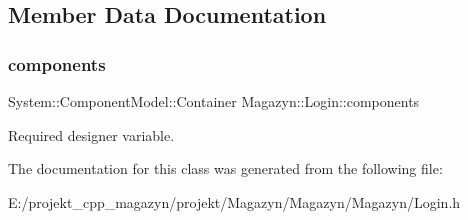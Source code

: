 \subsection{Member Data Documentation}
\hypertarget{class_magazyn_1_1_login_a2457e69b73940be27550fcfe3a8040c8}{}\label{class_magazyn_1_1_login_a2457e69b73940be27550fcfe3a8040c8} 
\subsubsection{\texorpdfstring{components}{components}}
{\footnotesize\ttfamily System\+::\+Component\+Model\+::\+Container Magazyn\+::\+Login\+::components\hspace{0.3cm}{\ttfamily [private]}}



Required designer variable. 



The documentation for this class was generated from the following file\+:\begin{DoxyCompactItemize}
\item 
E\+:/projekt\+\_\+cpp\+\_\+magazyn/projekt/\+Magazyn/\+Magazyn/\+Magazyn/Login.\+h\end{DoxyCompactItemize}
